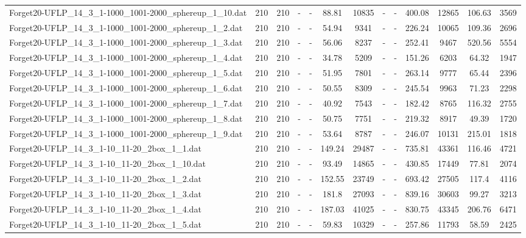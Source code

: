 \begin{table}[!ht]
{\begin{tabular}{lcccccccccccc}
Forget20-UFLP\_14\_3\_1-1000\_1001-2000\_sphereup\_1\_10.dat & 210 & 210 &  - &  - & 88.81 & 10835 &  - &  - & 400.08 & 12865 & 106.63 & 3569 \\
Forget20-UFLP\_14\_3\_1-1000\_1001-2000\_sphereup\_1\_2.dat & 210 & 210 &  - &  - & 54.94 & 9341 &  - &  - & 226.24 & 10065 & 109.36 & 2696 \\
Forget20-UFLP\_14\_3\_1-1000\_1001-2000\_sphereup\_1\_3.dat & 210 & 210 &  - &  - & 56.06 & 8237 &  - &  - & 252.41 & 9467 & 520.56 & 5554 \\
Forget20-UFLP\_14\_3\_1-1000\_1001-2000\_sphereup\_1\_4.dat & 210 & 210 &  - &  - & 34.78 & 5209 &  - &  - & 151.26 & 6203 & 64.32 & 1947 \\
Forget20-UFLP\_14\_3\_1-1000\_1001-2000\_sphereup\_1\_5.dat & 210 & 210 &  - &  - & 51.95 & 7801 &  - &  - & 263.14 & 9777 & 65.44 & 2396 \\
Forget20-UFLP\_14\_3\_1-1000\_1001-2000\_sphereup\_1\_6.dat & 210 & 210 &  - &  - & 50.55 & 8309 &  - &  - & 245.54 & 9963 & 71.23 & 2298 \\
Forget20-UFLP\_14\_3\_1-1000\_1001-2000\_sphereup\_1\_7.dat & 210 & 210 &  - &  - & 40.92 & 7543 &  - &  - & 182.42 & 8765 & 116.32 & 2755 \\
Forget20-UFLP\_14\_3\_1-1000\_1001-2000\_sphereup\_1\_8.dat & 210 & 210 &  - &  - & 50.75 & 7751 &  - &  - & 219.32 & 8917 & 49.39 & 1720 \\
Forget20-UFLP\_14\_3\_1-1000\_1001-2000\_sphereup\_1\_9.dat & 210 & 210 &  - &  - & 53.64 & 8787 &  - &  - & 246.07 & 10131 & 215.01 & 1818 \\
Forget20-UFLP\_14\_3\_1-10\_11-20\_2box\_1\_1.dat & 210 & 210 &  - &  - & 149.24 & 29487 &  - &  - & 735.81 & 43361 & 116.46 & 4721 \\
Forget20-UFLP\_14\_3\_1-10\_11-20\_2box\_1\_10.dat & 210 & 210 &  - &  - & 93.49 & 14865 &  - &  - & 430.85 & 17449 & 77.81 & 2074 \\
Forget20-UFLP\_14\_3\_1-10\_11-20\_2box\_1\_2.dat & 210 & 210 &  - &  - & 152.55 & 23749 &  - &  - & 693.42 & 27505 & 117.4 & 4116 \\
Forget20-UFLP\_14\_3\_1-10\_11-20\_2box\_1\_3.dat & 210 & 210 &  - &  - & 181.8 & 27093 &  - &  - & 839.16 & 30603 & 99.27 & 3213 \\
Forget20-UFLP\_14\_3\_1-10\_11-20\_2box\_1\_4.dat & 210 & 210 &  - &  - & 187.03 & 41025 &  - &  - & 830.75 & 43345 & 206.76 & 6471 \\
Forget20-UFLP\_14\_3\_1-10\_11-20\_2box\_1\_5.dat & 210 & 210 &  - &  - & 59.83 & 10329 &  - &  - & 257.86 & 11793 & 58.59 & 2425 \\

\end{tabular}}
\end{table}
